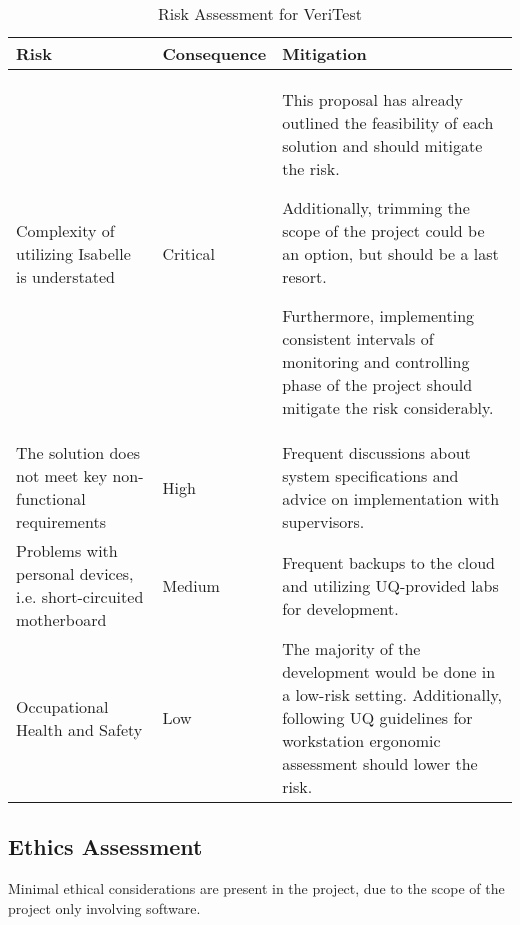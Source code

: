 \begin{table}[h]
    \centering
    \begin{tabular}{|L{0.25\textwidth}|l|L{0.5\textwidth}|}
        \hline
        \textbf{Risk} & \textbf{Consequence} & \textbf{Mitigation} \\
        \hline\hline
        Complexity of utilizing Isabelle is understated & Critical 
            & This proposal has already outlined the feasibility of each solution and should mitigate the risk. 
            
            Additionally, trimming the scope of the project could be an option, but should be a last resort.

            Furthermore, implementing consistent intervals of monitoring and controlling phase of the project should mitigate the 
            risk considerably. \\
        \hline
        The solution does not meet key non-functional requirements & High
            & Frequent discussions about system specifications and advice on implementation with supervisors. \\
        \hline
        Problems with personal devices, i.e. short-circuited motherboard & Medium
            & Frequent backups to the cloud and utilizing UQ-provided labs for development. \\
        \hline
        Occupational Health and Safety & Low
            & The majority of the development would be done in a low-risk setting. Additionally, following UQ guidelines for 
            workstation ergonomic assessment should lower the risk. \\
        \hline
    \end{tabular}
    \caption{Risk Assessment for VeriTest}
\end{table}

\subsection{Ethics Assessment}

Minimal ethical considerations are present in the project, due to the scope of the project only involving 
software.